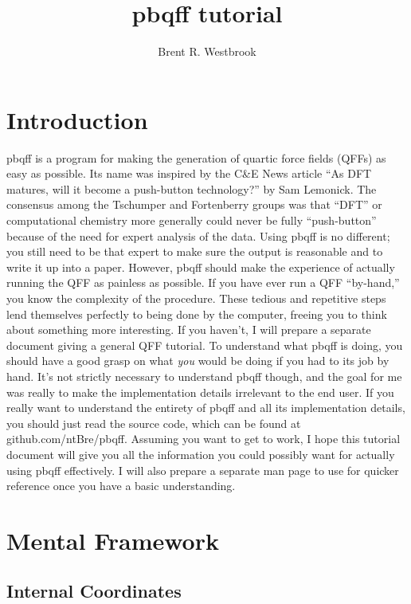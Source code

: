 \documentclass{article}
\title{pbqff tutorial}
\author{Brent R. Westbrook}
\begin{document}
\maketitle


\section{Introduction}

pbqff is a program for making the generation of quartic force fields
(QFFs) as easy as possible. Its name was inspired by the C\&E News
article ``As DFT matures, will it become a push-button technology?''
by Sam Lemonick. The consensus among the Tschumper and Fortenberry
groups was that ``DFT'' or computational chemistry more generally
could never be fully ``push-button'' because of the need for expert
analysis of the data. Using pbqff is no different; you still need to
be that expert to make sure the output is reasonable and to write it
up into a paper. However, pbqff should make the experience of actually
running the QFF as painless as possible. If you have ever run a QFF
``by-hand,'' you know the complexity of the procedure. These tedious
and repetitive steps lend themselves perfectly to being done by the
computer, freeing you to think about something more interesting. If
you haven't, I will prepare a separate document giving a general QFF
tutorial. To understand what pbqff is doing, you should have a good
grasp on what \textit{you} would be doing if you had to its job by
hand. It's not strictly necessary to understand pbqff though, and the
goal for me was really to make the implementation details irrelevant
to the end user. If you really want to understand the entirety of
pbqff and all its implementation details, you should just read the
source code, which can be found at github.com/ntBre/pbqff. Assuming
you want to get to work, I hope this tutorial document will give you
all the information you could possibly want for actually using pbqff
effectively. I will also prepare a separate man page to use for
quicker reference once you have a basic understanding.

\section{Mental Framework}

\subsection{Internal Coordinates}
\end{document}
